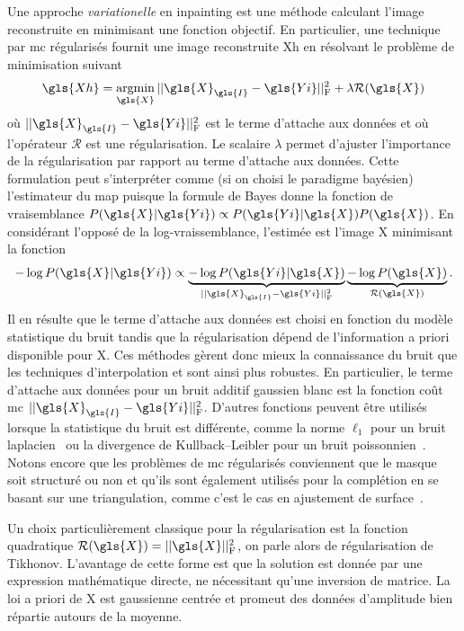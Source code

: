 Une approche \emph{variationelle} en inpainting est une méthode calculant l'image reconstruite en minimisant une fonction objectif. En particulier, une technique par \gls{mc} régularisés fournit une image reconstruite \gls{Xh} en résolvant le problème de minimisation suivant~\cite[Section~6.3]{boyd2004convex}
\begin{equation}\label{eq-MC-regul}
    \gls{Xh} = \argmin_{\gls{X}} \frobnorm{\gls{X}_{\gls{I}} - \gls{Yi}} + \lambda \mathcal{R}(\gls{X})
\end{equation}
où $\frobnorm{\gls{X}_{\gls{I}} - \gls{Yi}}$ est le terme d'attache aux données et où l'opérateur $\mathcal{R}$ est une régularisation. Le scalaire $\lambda$ permet d'ajuster l'importance de la régularisation par rapport au terme d'attache aux données. Cette formulation peut s'interpréter comme (si on choisi le paradigme bayésien) l'estimateur du \gls{map} puisque la formule de Bayes donne la fonction de vraisemblance $P(\gls{X}|\gls{Yi}) \propto P(\gls{Yi}|\gls{X}) P(\gls{X})$. En considérant l'opposé de la log-vraissemblance, l'estimée est l'image \gls{X} minimisant la fonction
\begin{equation}
    -\log P(\gls{X}|\gls{Yi}) \propto
    \underbrace{-\log P(\gls{Yi}|\gls{X})}_{\frobnorm{\gls{X}_{\gls{I}} - \gls{Yi}}}
    \underbrace{- \log P(\gls{X})}_{\mathcal{R}(\gls{X})}.
\end{equation}
Il en résulte que le terme d'attache aux données est choisi en fonction du modèle statistique du bruit tandis que la régularisation dépend de l'information a priori disponible pour \gls{X}. Ces méthodes gèrent donc mieux la connaissance du bruit que les techniques d'interpolation et sont ainsi plus robustes. En particulier, le terme d'attache aux données pour un bruit additif gaussien blanc est la fonction coût \gls{mc} $\frobnorm{\gls{X}_{\gls{I}} - \gls{Yi}}$. D'autres fonctions peuvent être utilisés lorsque la statistique du bruit est différente, comme la norme $\ell_1$ pour un bruit laplacien~\cite{frecon2017bayesian} ou la divergence de Kullback–Leibler pour un bruit poissonnien~\cite{ono2013poisson}. Notons encore que les problèmes de \gls{mc} régularisés conviennent que le masque soit structuré ou non et qu'ils sont également utilisés pour la complétion en se basant sur une triangulation, comme c'est le cas en ajustement de surface~\cite{zhong2016surface,cazals2006delaunay}.

Un choix particulièrement classique pour la régularisation est la fonction quadratique $\mathcal{R}(\gls{X}) = \frobnorm{\gls{X}}$, on parle alors de régularisation de Tikhonov. L'avantage de cette forme est que la solution est  donnée par une expression mathématique directe, ne nécessitant qu'une inversion de matrice. La loi a priori de \gls{X} est gaussienne centrée et promeut des données d'amplitude bien répartie autours de la moyenne.


